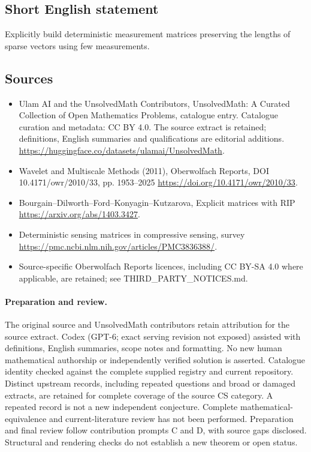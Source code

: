 \documentclass[11pt]{article}
\begin{document}
\subsection{Short English statement}
Explicitly build deterministic measurement matrices preserving the lengths of sparse vectors using few measurements.
\subsection{Sources}
\begin{itemize}
\item[\hypertarget{source:statement:1}{S1}] Ulam AI and the UnsolvedMath Contributors, UnsolvedMath: A Curated Collection of Open Mathematics Problems, catalogue entry. Catalogue curation and metadata: CC BY 4.0. The source extract is retained; definitions, English summaries and qualifications are editorial additions.
\url{https://huggingface.co/datasets/ulamai/UnsolvedMath}.
\item[\hypertarget{source:statement:2}{S2}] Wavelet and Multiscale Methods (2011), Oberwolfach Reports, DOI 10.4171/owr/2010/33, pp. 1953--2025
\url{https://doi.org/10.4171/owr/2010/33}.
\item[\hypertarget{source:statement:3}{S3}] Bourgain--Dilworth--Ford--Konyagin--Kutzarova, Explicit matrices with RIP
\url{https://arxiv.org/abs/1403.3427}.
\item[\hypertarget{source:statement:4}{S4}] Deterministic sensing matrices in compressive sensing, survey
\url{https://pmc.ncbi.nlm.nih.gov/articles/PMC3836388/}.
\item Source-specific Oberwolfach Reports licences, including CC BY-SA 4.0 where applicable, are retained; see THIRD\_PARTY\_NOTICES.md.
\end{itemize}
\paragraph{Preparation and review.}
The original source and UnsolvedMath contributors retain attribution for the source extract. Codex (GPT-6; exact serving revision not exposed) assisted with definitions, English summaries, scope notes and formatting. No new human mathematical authorship or independently verified solution is asserted. Catalogue identity checked against the complete supplied registry and current repository. Distinct upstream records, including repeated questions and broad or damaged extracts, are retained for complete coverage of the source CS category. A repeated record is not a new independent conjecture. Complete mathematical-equivalence and current-literature review has not been performed. Preparation and final review follow contribution prompts C and D, with source gaps disclosed. Structural and rendering checks do not establish a new theorem or open status.
\label{end:statement}
\end{document}
